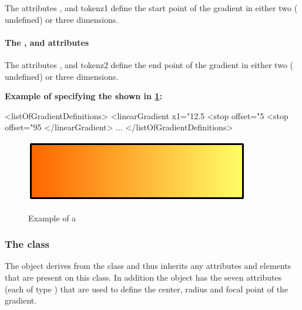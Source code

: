 The attributes ,  and token{z1} define the start point of the gradient in either two ( undefined) or three dimensions.

\paragraph{The \fixttspace{}, \fixttspace{} and \fixttspace{} attributes}

The attributes ,  and token{z2} define the end point of the gradient in either two ( undefined) or three dimensions.




{
  {\bf
Example of specifying the \LinearGradient shown in \ref{fig:lingrad}:
}
}
{\footnotesize
\begin{example}
<listOfGradientDefinitions>
  <linearGradient x1="12.5%
    <stop offset="5%
    <stop offset="95%
  </linearGradient>
        ...
</listOfGradientDefinitions>
\end{example}
}

\begin{figure}[h!]
  \centering
  \includegraphics[scale=0.5]{figures/lingrad01.pdf}\\
  \caption{Example of a \LinearGradient}
  \label{fig:lingrad}
\end{figure}


\subsubsection{The  class}
\label{radialgradient-class}


The \RadialGradient object derives from the \GradientBase class and thus
inherits any attributes and elements that are present on this class.
In addition the \RadialGradient object has the seven attributes (each of type \RelAbsVector) that are used to define the center, radius and focal point of the gradient.




